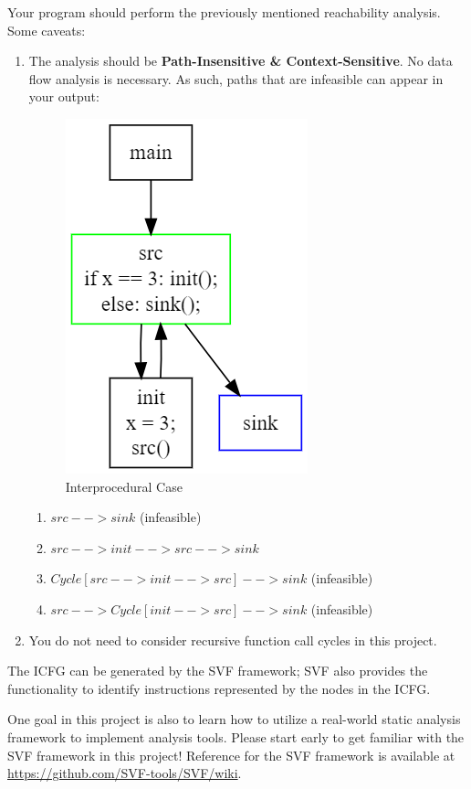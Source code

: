\documentclass[12pt]{article}
\newcommand{\codeIn}[1]{{\small\tt{#1}}}
\begin{document}
Your program should perform the previously mentioned reachability analysis.
Some caveats:
\begin{enumerate}
    \item The analysis should be \textbf{Path-Insensitive \& Context-Sensitive}. No data flow analysis is necessary. As such, paths that are infeasible can appear in your output:
\begin{figure}[htpb]
    \centering
    \includegraphics[scale=0.6]{interprocedural.png}
    \caption{Interprocedural Case}
    \label{case1}
\end{figure}

    \begin{enumerate}
        \item \codeIn{$src-->sink$} (infeasible)
        \item \codeIn{$src-->init-->src-->sink$}
        \item \codeIn{$Cycle[src-->init-->src]-->sink$} (infeasible)
        \item \codeIn{$src-->Cycle[init-->src]-->sink$} (infeasible)
    \end{enumerate}

    \item You do not need to consider recursive function call cycles in this project.
    
\end{enumerate}
The ICFG can be generated by the SVF framework; SVF also provides the functionality to identify instructions represented by the nodes in the ICFG.

One goal in this project is also to learn how to utilize
a real-world static analysis framework to implement analysis
tools. Please start early to get familiar with the SVF framework in this project!
Reference for the SVF framework is available at \url{https://github.com/SVF-tools/SVF/wiki}.
\end{document}
